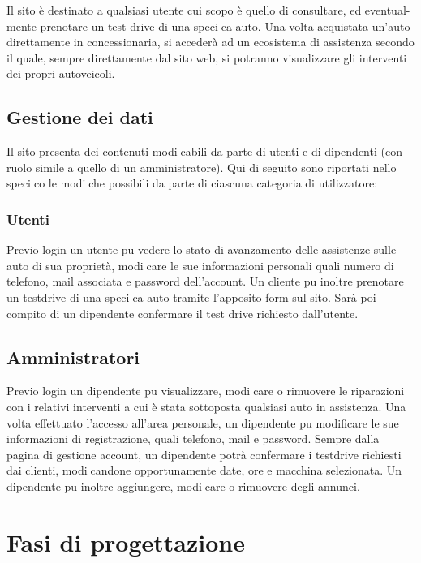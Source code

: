 Il sito è destinato a qualsiasi utente cui scopo è quello di consultare, ed eventual-
mente prenotare un test drive di una specica auto. Una volta acquistata un'auto
direttamente in concessionaria, si accederà ad un ecosistema di assistenza secondo
il quale, sempre direttamente dal sito web, si potranno visualizzare gli interventi
dei propri autoveicoli.

\subsection{Gestione dei dati}

Il sito presenta dei contenuti modicabili da parte di utenti e di dipendenti (con
ruolo simile a quello di un amministratore). Qui di seguito sono riportati nello
specico le modiche possibili da parte di ciascuna categoria di utilizzatore:

\subsubsection{Utenti}

Previo login un utente pu vedere lo stato di avanzamento delle assistenze sulle
auto di sua proprietà, modicare le sue informazioni personali quali numero di
telefono, mail associata e password dell'account. Un cliente pu inoltre prenotare
un testdrive di una specica auto tramite l'apposito form sul sito. Sarà poi compito
di un dipendente confermare il test drive richiesto dall'utente.

\subsection{Amministratori}

Previo login un dipendente pu visualizzare, modicare o rimuovere le riparazioni
con i relativi interventi a cui è stata sottoposta qualsiasi auto in assistenza. Una
volta effettuato l'accesso all'area personale, un dipendente pu modificare le sue
informazioni di registrazione, quali telefono, mail e password. Sempre dalla pagina
di gestione account, un dipendente potrà confermare i testdrive richiesti dai clienti,
modicandone opportunamente date, ore e macchina selezionata. Un dipendente
pu inoltre aggiungere, modicare o rimuovere degli annunci.

\section{Fasi di progettazione}

